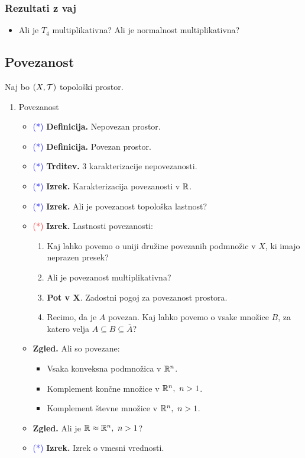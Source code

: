 \subsubsection*{Rezultati z vaj}
\begin{itemize}
    \item Ali je $T_4$ multiplikativna? Ali je normalnost multiplikativna?
\end{itemize}

\subsection{Povezanost}
Naj bo $(X, \mathcal{T})$ topološki prostor.
\begin{enumerate}
    \item Povezanost
    \begin{itemize}
        \item \textcolor{blue}{(*)} \textbf{Definicija.} Nepovezan prostor.
        \item \textcolor{blue}{(*)} \textbf{Definicija.} Povezan prostor.
        \item \textcolor{blue}{(*)} \textbf{Trditev.} 3 karakterizacije nepovezanosti.
        \item \textcolor{blue}{(*)} \textbf{Izrek.} Karakterizacija povezanosti v $\mathbb{R}$.        
        \item \textcolor{blue}{(*)} \textbf{Izrek.} Ali je povezanost topološka lastnost?
        \item \textcolor{red}{(*)} \textbf{Izrek.} Lastnosti povezanosti:
        \begin{enumerate}
            \item Kaj lahko povemo o uniji družine povezanih podmnožic v $X$, ki imajo neprazen presek?
            \item Ali je povezanost multiplikativna?
            \item \textbf{Pot v X}. Zadostni pogoj za povezanost prostora.
            \item Recimo, da je $A$ povezan. Kaj lahko povemo o vsake množice $B$, za katero velja $A \subseteq B \subseteq \overline{A}$?
        \end{enumerate}
        \item \textbf{Zgled.} Ali so povezane:
        \begin{itemize}
            \item Vsaka konveksna podmnožica v $\mathbb{R}^n$.
            \item Komplement končne množice v $\mathbb{R}^n, \ n > 1$.
            \item Komplement števne množice v $\mathbb{R}^n, \ n > 1$.
        \end{itemize}
        \item \textbf{Zgled.} Ali je $\mathbb{R} \approx \mathbb{R}^n, \ n > 1$?
        \item \textcolor{blue}{(*)} \textbf{Izrek.} Izrek o vmesni vrednosti.
    \end{itemize}
    

\end{enumerate}
